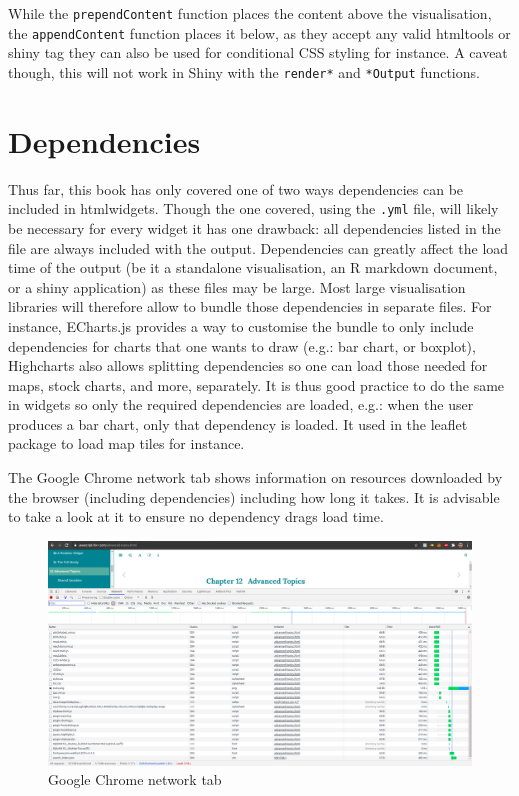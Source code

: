 \documentclass[
]{krantz}
\begin{document}
While the \texttt{prependContent} function places the content above the visualisation, the \texttt{appendContent} function places it below, as they accept any valid htmltools or shiny tag they can also be used for conditional CSS styling for instance. A caveat though, this will not work in Shiny with the \texttt{render*} and \texttt{*Output} functions.

\hypertarget{dependencies}{%
\section{Dependencies}\label{dependencies}}

Thus far, this book has only covered one of two ways dependencies can be included in htmlwidgets. Though the one covered, using the \texttt{.yml} file, will likely be necessary for every widget it has one drawback: all dependencies listed in the file are always included with the output. Dependencies can greatly affect the load time of the output (be it a standalone visualisation, an R markdown document, or a shiny application) as these files may be large. Most large visualisation libraries will therefore allow to bundle those dependencies in separate files. For instance, ECharts.js provides a way to customise the bundle to only include dependencies for charts that one wants to draw (e.g.: bar chart, or boxplot), Highcharts also allows splitting dependencies so one can load those needed for maps, stock charts, and more, separately. It is thus good practice to do the same in widgets so only the required dependencies are loaded, e.g.: when the user produces a bar chart, only that dependency is loaded. It used in the leaflet package to load map tiles for instance.

The Google Chrome network tab shows information on resources downloaded by the browser (including dependencies) including how long it takes. It is advisable to take a look at it to ensure no dependency drags load time.

\begin{figure}
\centering
\includegraphics{images/htmlwidgets-performances.png}
\caption{Google Chrome network tab}
\end{figure}
\end{document}
